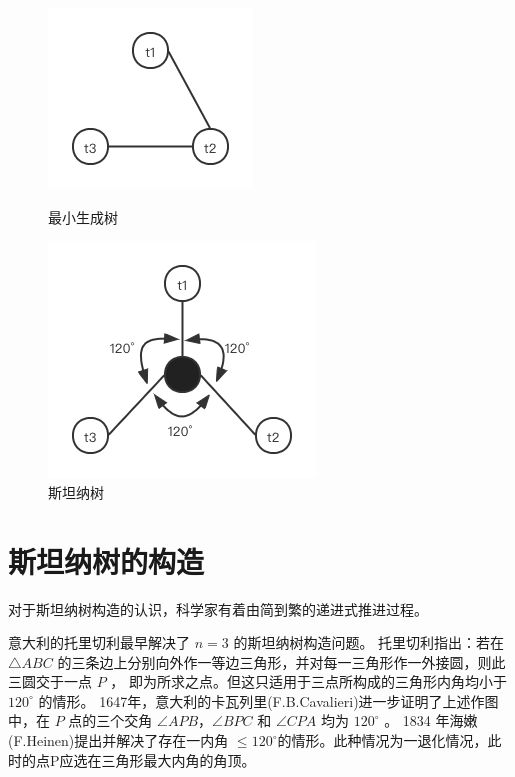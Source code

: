 \documentclass{SCIS2022cn}
\begin{document}
\begin{figure}
    \begin{minipage}[htbp]{0.5\linewidth}
        \centering
        \includegraphics[scale=0.5]{img/pic1.png}
        \caption{最小生成树}
        \label{pic1}
    \end{minipage}%
    \begin{minipage}[htbp]{0.5\linewidth}
        \centering
        \includegraphics[scale=0.5]{img/pic2.png}
        \caption{斯坦纳树}
        \label{pic2}
    \end{minipage}
\end{figure}

\section{斯坦纳树的构造}

对于斯坦纳树构造的认识，科学家有着由简到繁的递进式推进过程。

意大利的托里切利最早解决了 $n=3$ 的斯坦纳树构造问题。
托里切利指出：若在 $ \triangle  ABC$ 的三条边上分别向外作一等边三角形，并对每一三角形作一外接圆，则此三圆交于一点 $P$ ，
即为所求之点。但这只适用于三点所构成的三角形内角均小于 $120^{\circ}$ 的情形。
1647年，意大利的卡瓦列里(F.B.Cavalieri)进一步证明了上述作图中，在 $P$ 点的三个交角 $\angle  APB$，$\angle BPC$ 和 $\angle CPA$ 均为 $120^{\circ}$ 。
1834 年海嫩(F.Heinen)提出并解决了存在一内角 $\leq  120^{\circ}$的情形。此种情况为一退化情况，此时的点P应选在三角形最大内角的角顶。
\end{document}
